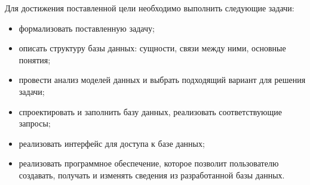 Для достижения поставленной цели необходимо выполнить следующие задачи:

\begin{itemize}
	\item формализовать поставленную задачу;
	\item описать структуру базы данных: сущности, связи между ними, основные понятия;
	\item провести анализ моделей данных и выбрать подходящий вариант для решения задачи;
	\item спроектировать и заполнить базу данных, реализовать соответствующие запросы;
	\item реализовать интерфейс для доступа к базе данных;
	\item реализовать программное обеспечение, которое позволит пользователю создавать, получать и изменять сведения из разработанной базы данных.
\end{itemize}

